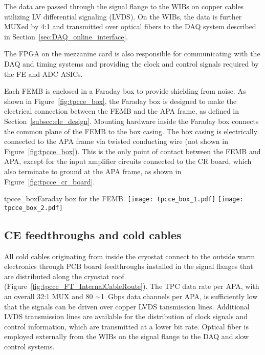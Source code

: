 The data are passed through the signal flange to the WIBs on copper cables utilizing LV differential signaling (LVDS).
On the WIBs, the data is further MUXed by 4:1 and transmitted over optical
fibers to the DAQ system described in Section~\ref{sec:DAQ_online_interface}.

The FPGA on the mezzanine card is also responsible for communicating with the
DAQ and timing systems and providing the clock and control signals required by the FE and ADC ASICs.

Each FEMB is enclosed in a Faraday box to provide shielding from noise. 
As shown in Figure~\ref{fig:tpcce_box}, the Faraday box is designed to make the electrical connection 
between the FEMB and the APA frame, as defined in Section~\ref{subsec:ele_design}. Mounting 
hardware inside the Faraday box connects the common plane of the FEMB to the box casing. The
box casing is electrically connected to the APA frame via twisted conducting wire (not 
shown in Figure~\ref{fig:tpcce_box}). This is the only point of contact between the FEMB and
APA, except for the input amplifier circuits connected to the CR board, which also terminate to
ground at the APA frame, as shown in Figure~\ref{fig:tpcce_cr_board}.

\begin{cdrfigure}{tpcce_box}{Faraday box for the FEMB.}
\texttt{[image: tpcce\_box\_1.pdf]}
\texttt{[image: tpcce\_box\_2.pdf]}
\end{cdrfigure}

%
\subsection{CE feedthroughs and cold cables}
\label{subsec:ce_feedthrough}

All cold cables originating from inside the cryostat connect to the outside warm electronics through PCB board feedthroughs
installed in the signal flanges that are distributed along the cryostat roof (Figure~\ref{fig:tpcce_FT_InternalCableRoute}).
The TPC data rate per APA, with an overall 32:1 MUX and 80 $\sim$1~Gbps data channels per APA,
is sufficiently low that the signals can be driven over copper LVDS tansmission lines.
Additional LVDS transmission lines are available for the distribution of clock signals and control information,
which are transmitted at a lower bit rate.
Optical fiber is employed externally from the WIBs on the signal flange to the DAQ and slow control systems.

